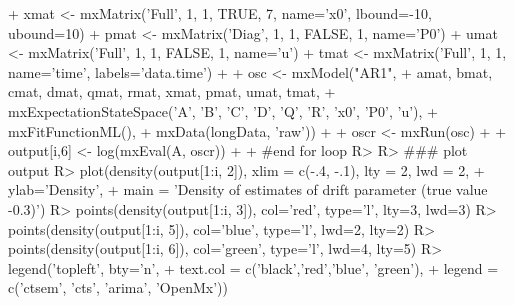 \documentclass[nojss]{jss}\usepackage[]{graphicx}\usepackage[]{color}
\begin{document}
\begin{Schunk}
\begin{Sinput}
{+ xmat <- mxMatrix('Full', 1, 1, TRUE, 7, name='x0', lbound=-10, ubound=10)
+ pmat <- mxMatrix('Diag', 1, 1, FALSE, 1, name='P0')
+ umat <- mxMatrix('Full', 1, 1, FALSE, 1, name='u')
+ tmat <- mxMatrix('Full', 1, 1, name='time', labels='data.time')
+ 
+ osc <- mxModel("AR1", 
+ 	amat, bmat, cmat, dmat, qmat, rmat, xmat, pmat, umat, tmat,
+ 	mxExpectationStateSpace('A', 'B', 'C', 'D', 'Q', 'R', 'x0', 'P0', 'u'),
+ 	mxFitFunctionML(),
+ 	mxData(longData, 'raw'))
+ 
+ oscr <- mxRun(osc)
+ 
+ output[i,6] <-  log(mxEval(A, oscr))
+ 
+ } #end for loop
R> 
R> ### plot output
R> plot(density(output[1:i, 2]), xlim = c(-.4, -.1), lty = 2, lwd = 2, 
+   ylab='Density',
+   main = 'Density of estimates of drift parameter (true value -0.3)')
R> points(density(output[1:i, 3]), col='red', type='l', lty=3, lwd=3)
R> points(density(output[1:i, 5]), col='blue', type='l', lwd=2, lty=2)
R> points(density(output[1:i, 6]), col='green', type='l', lwd=4, lty=5)
R> legend('topleft', bty='n', 
+   text.col = c('black','red','blue', 'green'),
+   legend = c('ctsem', 'cts', 'arima', 'OpenMx'))
\end{Sinput}
\end{Schunk}
\end{document}

